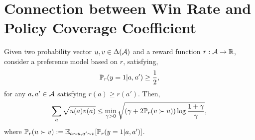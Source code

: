 \section{Connection between Win Rate and Policy Coverage Coefficient}\label{appx:win_rate_and_coverage}

\begin{lemma}\label{lem:diff_and_preference}
    Given two probability vector $u, v \in \Delta(\mathcal{A})$ and a reward function $r:\mathcal{A}\rightarrow{\mathbb{R}}$, consider a preference model based on $r$, satisfying,
    \begin{align*}
        {\mathbb{P}}_r(y=1|a,a') \geq \frac{1}{2},
    \end{align*}
    for any $a,a'\in\mathcal{A}$ satisfying $r(a) \geq r(a')$. Then,
    \begin{align*}
        \sum_a \sqrt{u(a) v(a)} \leq \min_{\gamma > 0} \sqrt{(\gamma + 2{\mathbb{P}}_r(v\succ u))\log\frac{1 + \gamma}{\gamma}},
    \end{align*}
    where ${\mathbb{P}}_r(u \succ v) := \mathbb{E}_{a\sim u,a'\sim v}[{\mathbb{P}}_r(y=1|a, a')]$.
\end{lemma}
